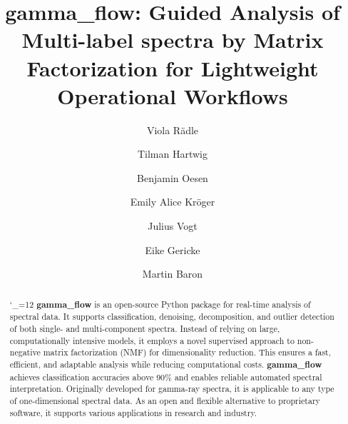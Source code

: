 \documentclass[preprint,12pt, a4paper]{elsarticle}
\begin{document}
\renewcommand{\labelenumii}{\arabic{enumi}.\arabic{enumii}}

\begin{frontmatter}



\title{gamma\_flow: \textbf{G}uided \textbf{A}nalysis of \textbf{M}ulti-label spectra by \textbf{Ma}trix \textbf{F}actorization for \textbf{L}ightweight \textbf{O}perational \textbf{W}orkflows}


\author[ki-lab]{Viola Rädle }
\author[ki-lab]{Tilman Hartwig}
\author[ki-lab]{Benjamin Oesen}
\author[bfs]{Emily Alice Kröger}
\author[bfs]{Julius Vogt}
\author[bfs]{Eike Gericke}
\author[bfs]{Martin Baron}

\address[ki-lab]{Application Lab for AI and Big Data, German Environmental Agency, Leipzig, Germany}
\address[bfs]{Federal Office for Radiation Protection, Berlin, Germany}




\begin{abstract}
\catcode`\_=12
\textbf{gamma_flow} is an open-source Python package for real-time analysis of spectral data. It supports classification, denoising, decomposition, and outlier detection of both single- and multi-component spectra. Instead of relying on large, computationally intensive models, it employs a novel supervised approach to non-negative matrix factorization (NMF) for dimensionality reduction. This ensures a fast, efficient, and adaptable analysis while reducing computational costs. \textbf{gamma_flow} achieves classification accuracies above 90\% and enables reliable automated spectral interpretation. Originally developed for gamma-ray spectra, it is applicable to any type of one-dimensional spectral data. As an open and flexible alternative to proprietary software, it supports various applications in research and industry. 
\end{abstract}


\end{frontmatter}
\end{document}
